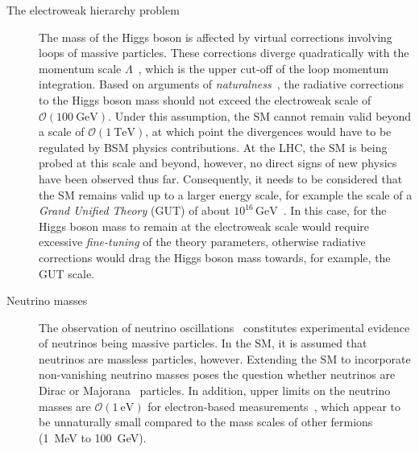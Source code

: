 \begin{description}
\item[The electroweak hierarchy problem] The mass of the Higgs boson is affected
  by virtual corrections involving loops of massive particles. These corrections
  diverge quadratically with the momentum scale $\Lambda$~\cite{Giudice:2008bi},
  which is the upper cut-off of the loop momentum integration. Based on
  arguments of
  \emph{naturalness}~\cite{Gildener:1976ai,Weinberg:1978ym,Susskind:1978ms,Giudice:2008bi},
  the radiative corrections to the Higgs boson mass should not exceed the
  electroweak scale of $\mathcal{O}(\SI{100}{\GeV})$. Under this assumption, the
  SM cannot remain valid beyond a scale of $\mathcal{O}(\SI{1}{\TeV})$, at which
  point the divergences would have to be regulated by BSM physics
  contributions. At the LHC, the SM is being probed at this scale and beyond,
  however, no direct signs of new physics have been observed thus
  far. Consequently, it needs to be considered that the SM remains valid up to a
  larger energy scale, for example the scale of a \emph{Grand Unified Theory}
  (GUT) of about $10^{16}\,\si{\GeV}$~\cite{pdg2020}. In this case, for the
  Higgs boson mass to remain at the electroweak scale would require excessive
  \emph{fine-tuning} of the theory parameters, otherwise radiative corrections
  would drag the Higgs boson mass towards, for example, the GUT scale.

\item[Neutrino masses] The observation of neutrino
  oscillations~\cite{Super-Kamiokande:1998kpq,SNO:2002tuh} constitutes
  experimental evidence of neutrinos being massive particles. In the SM, it is
  assumed that neutrinos are massless particles, however. Extending the SM to
  incorporate non-vanishing neutrino masses poses the question whether neutrinos
  are Dirac or Majorana~\cite{Majorana:1937vz} particles. In addition, upper
  limits on the neutrino masses are $\mathcal{O}(\SI{1}{\electronvolt})$ for
  electron-based measurements~\cite{KATRIN:2019yun}, which
  appear to be unnaturally small compared to the mass scales of other fermions
  (\SI{1}{\MeV} to \SI{100}{\GeV}).



\end{description}
